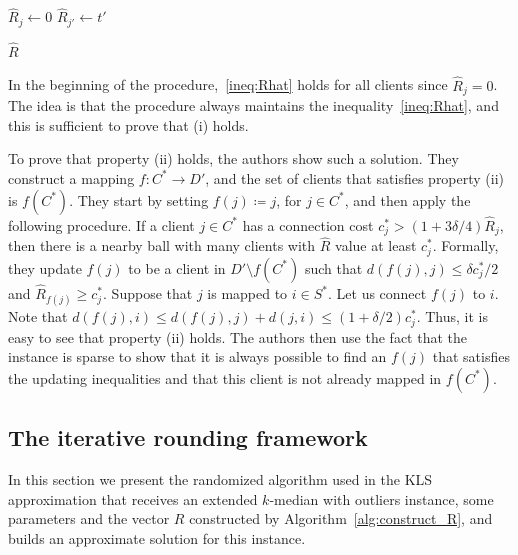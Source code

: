 \begin{algorithm}
\caption{Construct $\hat{R}$} \label{alg:construct_R}
\begin{algorithmic}[1]
    \State $\hat{R}_j \gets 0$
    \EndFor
    \State $\hat{R}_{j'} \gets t'$
    \EndIf
    \EndFor
    \EndFor

\State \Return $\hat{R}$
\end{algorithmic}
\end{algorithm}

In the beginning of the procedure,~\eqref{ineq:Rhat} holds for all clients since $\hat{R}_j = 0$. The idea is that the procedure always maintains the inequality~\eqref{ineq:Rhat}, and this is sufficient to prove that (i) holds. 

To prove that property (ii) holds, the authors show such a solution. They construct a mapping $f : C^* \to D'$, and the set of clients that satisfies property (ii) is $f(C^*)$. They start by setting $f(j) \coloneqq j$, for $j \in C^*$, and then apply the following procedure. If a client $j \in C^*$ has a connection cost $c_j^* > (1 + 3\delta/4)\hat{R}_j$, then there is a nearby ball with many clients with $\hat{R}$ value at least $c_j^*$. Formally, they update $f(j)$ to be a client in $D' \setminus f(C^*)$ such that $d(f(j),j) \leq \delta c_j^*/2$ and $\hat{R}_{f(j)} \geq c_j^*$.
Suppose that $j$ is mapped to $i \in S^*$. Let us connect $f(j)$ to $i$. Note that $d(f(j),i) \leq d(f(j),j) + d(j,i) \leq (1 +\delta/2)c_j^*$. Thus, it is easy to see that property (ii) holds. The authors then use the fact that the instance is sparse to show that it is always possible to find an $f(j)$ that satisfies the updating inequalities and that this client is not already mapped in $f(C^*)$.



\subsection{The iterative rounding framework}
In this section we present the randomized algorithm used in the KLS approximation that receives an extended $k$-median with outliers instance, some parameters and the vector $R$ constructed by {Algorithm~\ref{alg:construct_R}}, and builds an approximate solution for this instance. 

